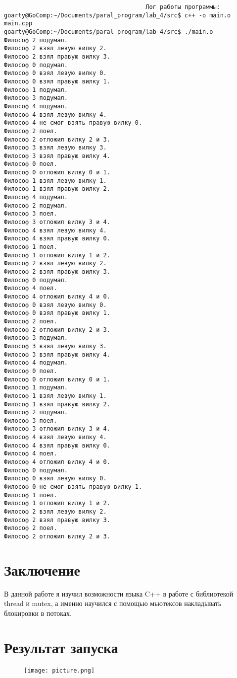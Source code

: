 \documentclass[a4paper, 14pt]{extarticle}
\begin{document}
\begin{verbatim}
                                        Лог работы программы:
goarty@GoComp:~/Documents/paral_program/lab_4/src$ c++ -o main.o main.cpp
goarty@GoComp:~/Documents/paral_program/lab_4/src$ ./main.o 
Философ 2 подумал.
Философ 2 взял левую вилку 2.
Философ 2 взял правую вилку 3.
Философ 0 подумал.
Философ 0 взял левую вилку 0.
Философ 0 взял правую вилку 1.
Философ 1 подумал.
Философ 3 подумал.
Философ 4 подумал.
Философ 4 взял левую вилку 4.
Философ 4 не смог взять правую вилку 0.
Философ 2 поел.
Философ 2 отложил вилку 2 и 3.
Философ 3 взял левую вилку 3.
Философ 3 взял правую вилку 4.
Философ 0 поел.
Философ 0 отложил вилку 0 и 1.
Философ 1 взял левую вилку 1.
Философ 1 взял правую вилку 2.
Философ 4 подумал.
Философ 2 подумал.
Философ 3 поел.
Философ 3 отложил вилку 3 и 4.
Философ 4 взял левую вилку 4.
Философ 4 взял правую вилку 0.
Философ 1 поел.
Философ 1 отложил вилку 1 и 2.
Философ 2 взял левую вилку 2.
Философ 2 взял правую вилку 3.
Философ 0 подумал.
Философ 4 поел.
Философ 4 отложил вилку 4 и 0.
Философ 0 взял левую вилку 0.
Философ 0 взял правую вилку 1.
Философ 2 поел.
Философ 2 отложил вилку 2 и 3.
Философ 3 подумал.
Философ 3 взял левую вилку 3.
Философ 3 взял правую вилку 4.
Философ 4 подумал.
Философ 0 поел.
Философ 0 отложил вилку 0 и 1.
Философ 1 подумал.
Философ 1 взял левую вилку 1.
Философ 1 взял правую вилку 2.
Философ 2 подумал.
Философ 3 поел.
Философ 3 отложил вилку 3 и 4.
Философ 4 взял левую вилку 4.
Философ 4 взял правую вилку 0.
Философ 4 поел.
Философ 4 отложил вилку 4 и 0.
Философ 0 подумал.
Философ 0 взял левую вилку 0.
Философ 0 не смог взять правую вилку 1.
Философ 1 поел.
Философ 1 отложил вилку 1 и 2.
Философ 2 взял левую вилку 2.
Философ 2 взял правую вилку 3.
Философ 2 поел.
Философ 2 отложил вилку 2 и 3.
\end{verbatim}

\section{Заключение}

    В данной работе я изучил возможности языка C++ в работе с библиотекой thread и mutex, а именно научился с помощью мьютексов накладывать блокировки в потоках.

\section{Результат запуска}
    
\begin{figure}[H]
	\centering
	\texttt{[image: picture.png]}
\label{fig:picture.png}
\end{figure}
\end{document}
